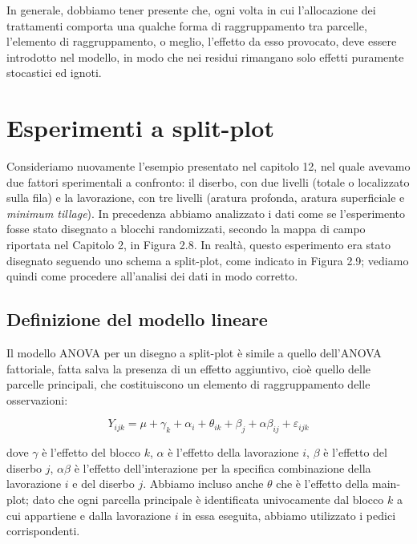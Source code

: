 \documentclass[a4paper,12pt,oneside]{book}
\begin{document}
In generale, dobbiamo tener presente che, ogni volta in cui l'allocazione dei trattamenti comporta una qualche forma di raggruppamento tra parcelle, l'elemento di raggruppamento, o meglio, l'effetto da esso provocato, deve essere introdotto nel modello, in modo che nei residui rimangano solo effetti puramente stocastici ed ignoti.

\hypertarget{esperimenti-a-split-plot}{%
\section{Esperimenti a split-plot}\label{esperimenti-a-split-plot}}

Consideriamo nuovamente l'esempio presentato nel capitolo 12, nel quale avevamo due fattori sperimentali a confronto: il diserbo, con due livelli (totale o localizzato sulla fila) e la lavorazione, con tre livelli (aratura profonda, aratura superficiale e \emph{minimum tillage}). In precedenza abbiamo analizzato i dati come se l'esperimento fosse stato disegnato a blocchi randomizzati, secondo la mappa di campo riportata nel Capitolo 2, in Figura 2.8. In realtà, questo esperimento era stato disegnato seguendo uno schema a split-plot, come indicato in Figura 2.9; vediamo quindi come procedere all'analisi dei dati in modo corretto.

\hypertarget{definizione-del-modello-lineare-3}{%
\subsection{Definizione del modello lineare}\label{definizione-del-modello-lineare-3}}

Il modello ANOVA per un disegno a split-plot è simile a quello dell'ANOVA fattoriale, fatta salva la presenza di un effetto aggiuntivo, cioè quello delle parcelle principali, che costituiscono un elemento di raggruppamento delle osservazioni:

\[Y_{ijk} = \mu + \gamma_k + \alpha_i + \theta_{ik} + \beta_j + \alpha\beta_{ij} + \varepsilon_{ijk}\]

dove \(\gamma\) è l'effetto del blocco \(k\), \(\alpha\) è l'effetto della lavorazione \(i\), \(\beta\) è l'effetto del diserbo \(j\), \(\alpha\beta\) è l'effetto dell'interazione per la specifica combinazione della lavorazione \(i\) e del diserbo \(j\). Abbiamo incluso anche \(\theta\) che è l'effetto della main-plot; dato che ogni parcella principale è identificata univocamente dal blocco \(k\) a cui appartiene e dalla lavorazione \(i\) in essa eseguita, abbiamo utilizzato i pedici corrispondenti.
\end{document}
